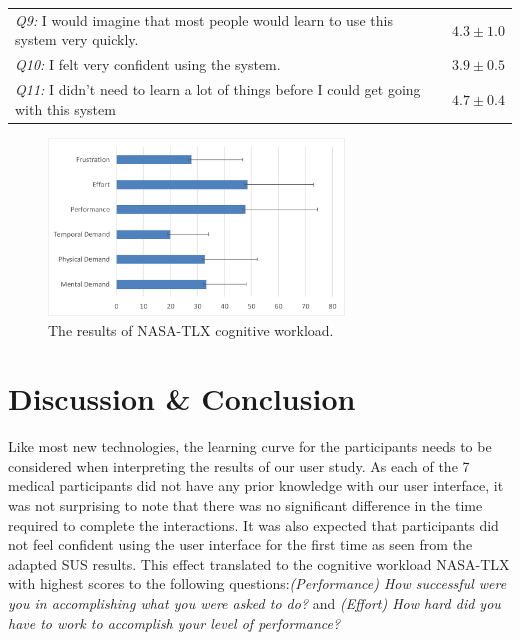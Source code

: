 {\begin{table}
\begin{center}
\begin{tabular}{p{8cm}|p{1.2cm}}
			\textit{Q9:} I would imagine that most people would learn to use this system very quickly. & $4.3\pm1.0$ \\
			\textit{Q10:} I felt very confident using the system. & $3.9\pm0.5$ \\
			\textit{Q11:} I didn't need to learn a lot of things before I could get going with this system & $4.7\pm0.4$
		\end{tabular}
	\end{center}
\end{table}
\begin{figure}
	\centering
	\includegraphics[width=0.7\textwidth]{figures/3-PointingOR/NASATLX.png}
	\caption{The results of NASA-TLX cognitive workload.}
	\label{fig:3-PointingOR:NASATLX}       %
\end{figure}

\section{Discussion \& Conclusion}%
Like most new technologies, the learning curve for the participants needs to be considered when interpreting the results of our user study. As each of the 7 medical participants did not have any prior knowledge with our user interface, it was not surprising to note that there was no significant difference in the time required to complete the interactions.  It was also expected that participants did not feel confident using the user interface for the first time as seen from the adapted SUS results. This effect translated to the cognitive workload NASA-TLX with highest scores to the following questions:\textit{(Performance) How successful were you in accomplishing what you were asked to do?} and \textit{(Effort) How hard did you have to work to accomplish your level of performance?}

}
